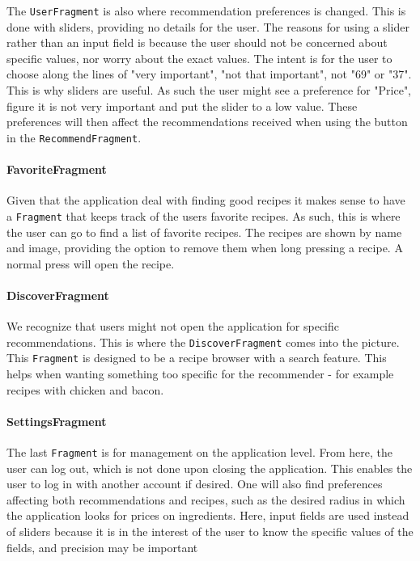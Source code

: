 The \texttt{UserFragment} is also where recommendation preferences is changed. This is done with sliders, providing no details for the user. The reasons for using a slider rather than an input field is because the user should not be concerned about specific values, nor worry about the exact values. The intent is for the user to choose along the lines of "very important", "not that important", not "69" or "37". This is why sliders are useful. As such the user might see a preference for "Price", figure it is not very important and put the slider to a low value. These preferences will then affect the recommendations received when using the button in the \texttt{RecommendFragment}.

\paragraph{FavoriteFragment}
Given that the application deal with finding good recipes it makes sense to have a \texttt{Fragment} that keeps track of the users favorite recipes. As such, this is where the user can go to find a list of favorite recipes. The recipes are shown by name and image, providing the option to remove them when long pressing a recipe. A normal press will open the recipe.

\paragraph{DiscoverFragment}
We recognize that users might not open the application for specific recommendations. This is where the \texttt{DiscoverFragment} comes into the picture. This \texttt{Fragment} is designed to be a recipe browser with a search feature. This helps when wanting something too specific for the recommender - for example recipes with chicken and bacon.

\paragraph{SettingsFragment}
The last \texttt{Fragment} is for management on the application level. From here, the user can log out, which is not done upon closing the application. This enables the user to log in with another account if desired. One will also find preferences affecting both recommendations and recipes, such as the desired radius in which the application looks for prices on ingredients. Here, input fields are used instead of sliders because it is in the interest of the user to know the specific values of the fields, and precision may be important

